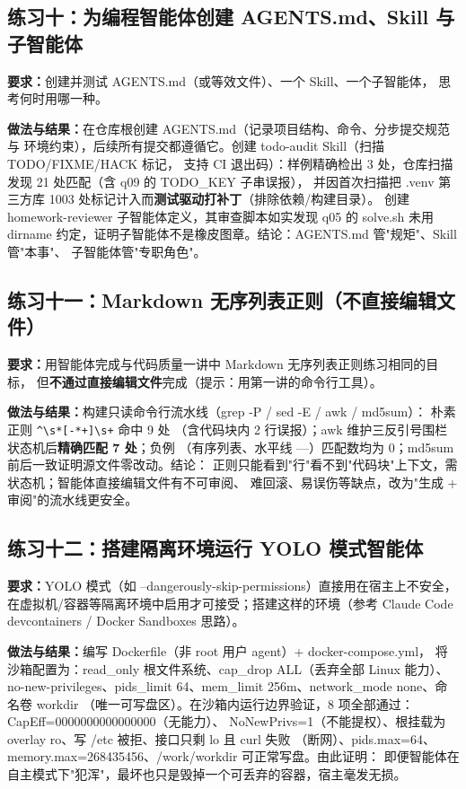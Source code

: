 \documentclass[UTF8]{ctexart}
\begin{document}
\subsection{练习十：为编程智能体创建 AGENTS.md、Skill 与子智能体}

\noindent\textbf{要求：}创建并测试 AGENTS.md（或等效文件）、一个 Skill、一个子智能体，
思考何时用哪一种。

\noindent\textbf{做法与结果：}在仓库根创建 AGENTS.md（记录项目结构、命令、分步提交规范与
环境约束），后续所有提交都遵循它。创建 todo-audit Skill（扫描 TODO/FIXME/HACK 标记，
支持 CI 退出码）：样例精确检出 3 处，仓库扫描发现 21 处匹配（含 q09 的 TODO\_KEY 子串误报），
并因首次扫描把 .venv 第三方库 1003 处标记计入而\textbf{测试驱动打补丁}（排除依赖/构建目录）。
创建 homework-reviewer 子智能体定义，其审查脚本如实发现 q05 的 solve.sh 未用
dirname 约定，证明子智能体不是橡皮图章。结论：AGENTS.md 管"规矩"、Skill 管"本事"、
子智能体管"专职角色"。

\subsection{练习十一：Markdown 无序列表正则（不直接编辑文件）}

\noindent\textbf{要求：}用智能体完成与代码质量一讲中 Markdown 无序列表正则练习相同的目标，
但\textbf{不通过直接编辑文件}完成（提示：用第一讲的命令行工具）。

\noindent\textbf{做法与结果：}构建只读命令行流水线（grep -P / sed -E / awk / md5sum）：
朴素正则 \texttt{\textasciicircum{}\textbackslash{}s*[-*+]\textbackslash{}s+} 命中 9 处
（含代码块内 2 行误报）；awk 维护三反引号围栏状态机后\textbf{精确匹配 7 处}；负例
（有序列表、水平线 ---）匹配数均为 0；md5sum 前后一致证明源文件零改动。结论：
正则只能看到"行"看不到"代码块"上下文，需状态机；智能体直接编辑文件有不可审阅、
难回滚、易误伤等缺点，改为"生成 + 审阅"的流水线更安全。

\subsection{练习十二：搭建隔离环境运行 YOLO 模式智能体}

\noindent\textbf{要求：}YOLO 模式（如 --dangerously-skip-permissions）直接用在宿主上不安全，
在虚拟机/容器等隔离环境中启用才可接受；搭建这样的环境（参考 Claude Code devcontainers /
Docker Sandboxes 思路）。

\noindent\textbf{做法与结果：}编写 Dockerfile（非 root 用户 agent）+ docker-compose.yml，
将沙箱配置为：read\_only 根文件系统、cap\_drop ALL（丢弃全部 Linux 能力）、
no-new-privileges、pids\_limit 64、mem\_limit 256m、network\_mode none、命名卷 workdir
（唯一可写盘区）。在沙箱内运行边界验证，8 项全部通过：CapEff=0000000000000000（无能力）、
NoNewPrivs=1（不能提权）、根挂载为 overlay ro、写 /etc 被拒、接口只剩 lo 且 curl 失败
（断网）、pids.max=64、memory.max=268435456、/work/workdir 可正常写盘。由此证明：
即便智能体在自主模式下"犯浑"，最坏也只是毁掉一个可丢弃的容器，宿主毫发无损。
\end{document}
